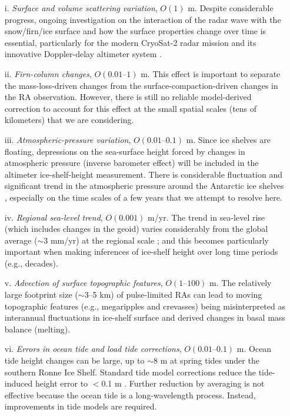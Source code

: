\begin{itemize}
  \item[i.]     {\it Surface and volume scattering variation}, $O(1)$ m. Despite considerable progress, ongoing investigation on the interaction of the radar wave with the snow/firn/ice surface and how the surface properties change over time is essential, particularly for the modern CryoSat-2 radar mission and its innovative Doppler-delay altimeter system \parencite{Wingham2006}.
  \item[ii.] 	{\it Firn-column changes}, $O(\text{0.01--1})$ m. This effect is important to separate the mass-loss-driven changes from the surface-compaction-driven changes in the RA observation. However, there is still no reliable model-derived correction to account for this effect at the small spatial scales (tens of kilometers) that we are considering.
  \item[iii.]   {\it Atmospheric-pressure variation}, $O(\text{0.01--0.1})$ m. Since ice shelves are floating, depressions on the sea-surface height forced by changes in atmospheric pressure (inverse barometer effect) will be included in the altimeter ice-shelf-height measurement. There is considerable fluctuation and significant trend in the atmospheric pressure around the Antarctic ice shelves \parencite{Padman2003}, especially on the time scales of a few years that we attempt to resolve here.
  \item[iv.]    {\it Regional sea-level trend}, $O(\text{0.001})$ m/yr. The trend in sea-level rise (which includes changes in the geoid) varies considerably from the global average ($\sim$3 mm/yr) at the regional scale \parencite{Church2004}; and this becomes particularly important when making inferences of ice-shelf height over long time periods (e.g., decades).
  \item[v.]     {\it Advection of surface topographic features}, $O(\text{1--100})$ m. The relatively large footprint size ($\sim$3--5 km) of pulse-limited RAs can lead to moving topographic features (e.g., megaripples and crevasses) being misinterpreted as interannual fluctuations in ice-shelf surface and derived changes in basal mass balance (melting).
  \item[vi.]    {\it Errors in ocean tide and load tide corrections}, $O(\text{0.01--0.1})$ m. Ocean tide height changes can be large, up to $\sim$8 m at spring tides under the southern Ronne Ice Shelf. Standard tide model corrections reduce the tide-induced height error to $<$0.1 m \parencite{King2005, King2011, Stammer2014}. Further reduction by averaging is not effective because the ocean tide is a long-wavelength process. Instead, improvements in tide models are required.
\end{itemize}


